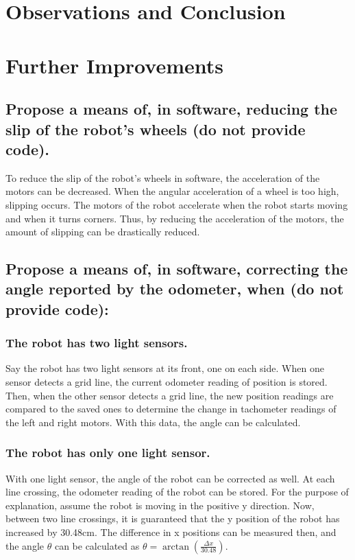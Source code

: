 \documentclass[11pt]{article} %
\begin{document}
\section{Observations and Conclusion}

\section{Further Improvements}
\subsection{Propose a means of, in software, reducing the slip of the robot's wheels (do not provide code).}
To reduce the slip of the robot's wheels in software, the acceleration of the motors can be
decreased. When the angular acceleration of a wheel is too high, slipping occurs. The motors of the
robot accelerate when the robot starts moving and when it turns corners. Thus, by reducing
the acceleration of the motors, the amount of slipping can be drastically reduced.
\subsection{Propose a means of, in software, correcting the angle reported by the odometer, when (do not provide code):}
\subsubsection{The robot has two light sensors.}
Say the robot has two light sensors at its front, one on each side. When one sensor detects a grid
line, the current odometer reading of position is stored. Then, when the other sensor
detects a grid line, the new position readings are compared to the saved ones to determine the
change in tachometer readings of the left and right motors. With this data, the angle can be
calculated.
\subsubsection{The robot has only one light sensor.}
With one light sensor, the angle of the robot can be corrected as well. At each line crossing, the
odometer reading of the robot can be stored. For the purpose of explanation, assume the robot is
moving in the positive y direction. Now, between two line crossings, it is guaranteed that the y
position of the robot has increased by 30.48cm. The difference in x positions can be measured then,
and the angle $\theta$ can be calculated as $\theta = \arctan{(\frac{\Delta x}{30.48})}$.
\end{document}
